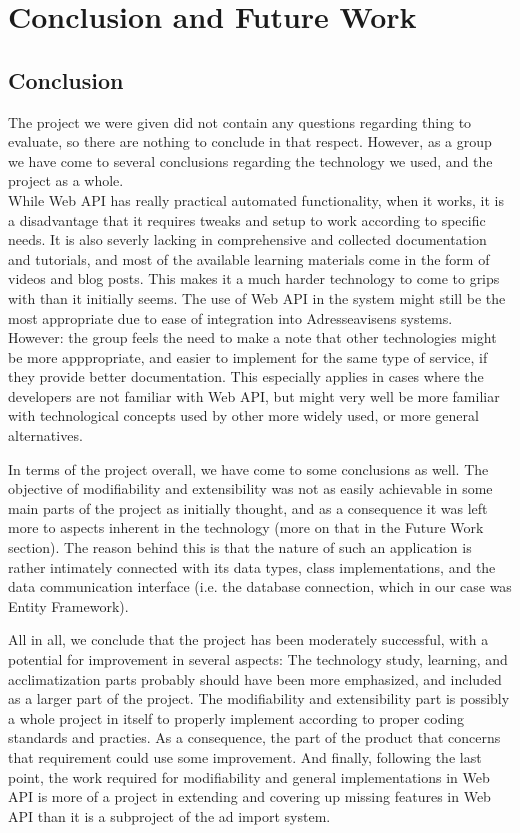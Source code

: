 \section{Conclusion and Future Work}

\subsection{Conclusion}

The project we were given did not contain any questions regarding thing to evaluate, so there are nothing to conclude in that respect. However, as a group we have come to several conclusions regarding the technology we used, and the project as a whole.
\\
While Web API has really practical automated functionality, when it works, it is a disadvantage that it requires tweaks and setup to work according to specific needs. It is also severly lacking in comprehensive and collected documentation and tutorials, and most of the available learning materials come in the form of videos and blog posts. This makes it a much harder technology to come to grips with than it initially seems. The use of Web API in the system might still be the most appropriate due to ease of integration into Adresseavisens systems. However: the group feels the need to make a note that other technologies might be more apppropriate, and easier to implement for the same type of service, if they provide better documentation. This especially applies in cases where the developers are not familiar with Web API, but might very well be more familiar with technological concepts used by other more widely used, or more general alternatives.

In terms of the project overall, we have come to some conclusions as well. The objective of modifiability and extensibility was not as easily achievable in some main parts of the project as initially thought, and as a consequence it was left more to aspects inherent in the technology (more on that in the Future Work section). The reason behind this is that the nature of such an application is rather intimately connected with its data types, class implementations, and the data communication interface (i.e. the database connection, which in our case was Entity Framework).

All in all, we conclude that the project has been moderately successful, with a potential for improvement in several aspects: The technology study, learning, and acclimatization parts probably should have been more emphasized, and included as a larger part of the project. The modifiability and extensibility part is possibly a whole project in itself to properly implement according to proper coding standards and practies. As a consequence, the part of the product that concerns that requirement could use some improvement. And finally, following the last point, the work required for modifiability and general implementations in Web API is more of a project in extending and covering up missing features in Web API than it is a subproject of the ad import system. 

